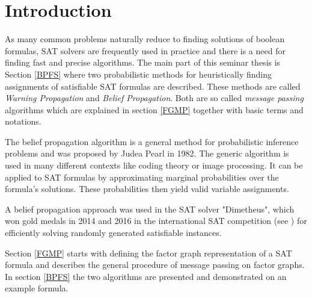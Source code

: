 \chapter{Introduction}

As many common problems naturally reduce to finding solutions of boolean formulas, SAT solvers are frequently used in practice and there is a need for finding fast and precise algorithms.  
The main part of this seminar thesis is Section \ref{BPFS} where two probabilistic methods for heuristically finding assignments of satisfiable SAT formulas are described. These methods are called \emph{Warning Propagation} and \emph{Belief Propagation}. Both are so called \emph{message passing} algorithms which are explained in section \ref{FGMP} together with basic terms and notations.

The belief propagation algorithm is a general method for probabilistic inference problems and was proposed by Judea Pearl in 1982. The generic algorithm is used in many different contexts like coding theory or image processing. It can be applied to SAT formulas by approximating marginal probabilities over the formula's solutions. These probabilities then yield valid variable assignments.

A belief propagation approach was used in the SAT solver "Dimetheus", which won gold medals in 2014 and 2016 in the international SAT competition (see \cite{satcomp}) for efficiently solving randomly generated satisfiable instances.

Section \ref{FGMP} starts with defining the factor graph representation of a SAT formula and describes the general procedure of message passing on factor graphs. \newline
In section \ref{BPFS} the two algorithms are presented and demonstrated on an example formula.